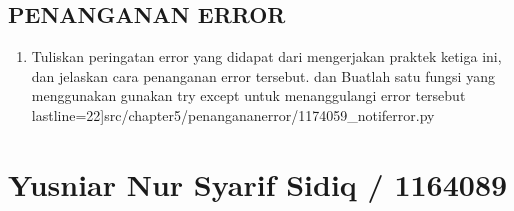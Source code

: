 	\subsection {PENANGANAN ERROR}
		\begin {enumerate}
			\item Tuliskan peringatan error yang didapat dari mengerjakan praktek ketiga ini, dan jelaskan cara penanganan error tersebut. dan Buatlah satu fungsi yang menggunakan gunakan try except untuk menanggulangi error tersebut
				 lastline=22]{src/chapter5/penangananerror/1174059_notiferror.py}
		\end {enumerate}

\section{Yusniar Nur Syarif Sidiq / 1164089}

